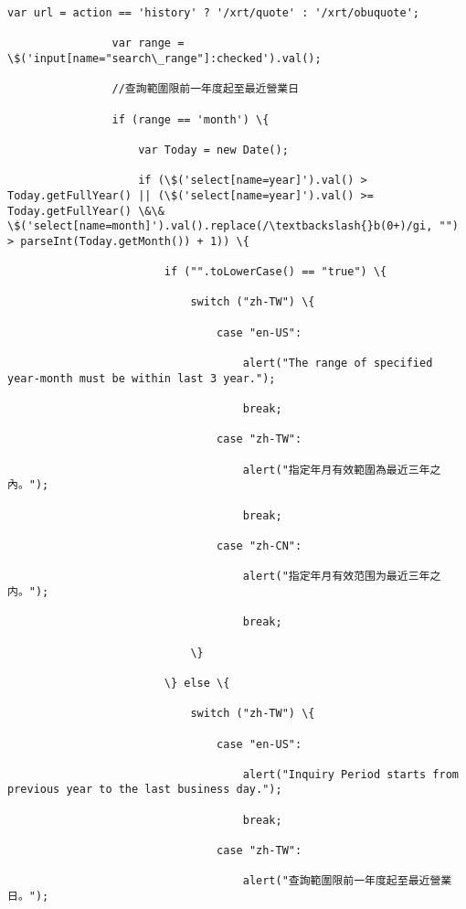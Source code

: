 \documentclass[11pt]{article}
\begin{document}
\begin{Verbatim}[commandchars=\\\{\}]
                var url = action == 'history' ? '/xrt/quote' : '/xrt/obuquote';

                var range = \$('input[name="search\_range"]:checked').val();

                //查詢範圍限前一年度起至最近營業日

                if (range == 'month') \{

                    var Today = new Date();

                    if (\$('select[name=year]').val() > Today.getFullYear() || (\$('select[name=year]').val() >= Today.getFullYear() \&\& \$('select[name=month]').val().replace(/\textbackslash{}b(0+)/gi, "") > parseInt(Today.getMonth()) + 1)) \{

                        if ("".toLowerCase() == "true") \{

                            switch ("zh-TW") \{

                                case "en-US":

                                    alert("The range of specified year-month must be within last 3 year.");

                                    break;

                                case "zh-TW":

                                    alert("指定年月有效範圍為最近三年之內。");

                                    break;

                                case "zh-CN":

                                    alert("指定年月有效范围为最近三年之内。");

                                    break;

                            \}

                        \} else \{

                            switch ("zh-TW") \{

                                case "en-US":

                                    alert("Inquiry Period starts from previous year to the last business day.");

                                    break;

                                case "zh-TW":

                                    alert("查詢範圍限前一年度起至最近營業日。");


\end{Verbatim}
\end{document}
